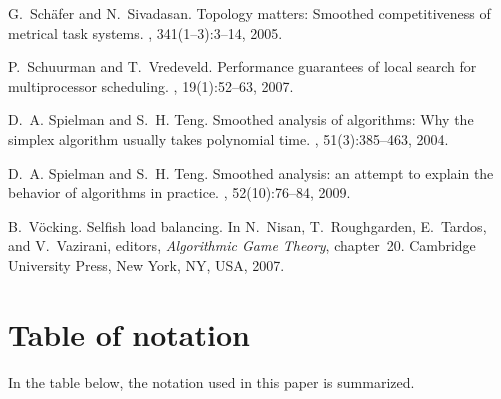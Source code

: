 \documentclass[a4paper,11pt,fleqn]{article}
\begin{document}
\begin{thebibliography}{10}
G.~Sch\"afer and N.~Sivadasan.
\newblock Topology matters: Smoothed competitiveness of metrical task systems.
, 341(1--3):3--14, 2005.

P.~Schuurman and T.~Vredeveld.
\newblock Performance guarantees of local search for multiprocessor scheduling.
, 19(1):52--63, 2007.

D.~A. Spielman and S.~H. Teng.
\newblock Smoothed analysis of algorithms: Why the simplex algorithm usually
  takes polynomial time.
, 51(3):385--463, 2004.

D.~A. Spielman and S.~H. Teng.
\newblock Smoothed analysis: an attempt to explain the behavior of algorithms
  in practice.
, 52(10):76--84, 2009.

B.~V\"ocking.
\newblock Selfish load balancing.
\newblock In N.~Nisan, T.~Roughgarden, E.~Tardos, and V.~Vazirani, editors,
  {\em Algorithmic Game Theory}, chapter~20. Cambridge University Press, New
  York, NY, USA, 2007.

\end{thebibliography}

\newpage
\appendix




\section{Table of notation}
\label{sec:appendix-table}

In the table below, the notation used in this paper is summarized.
\vspace{1em}
\end{document}

